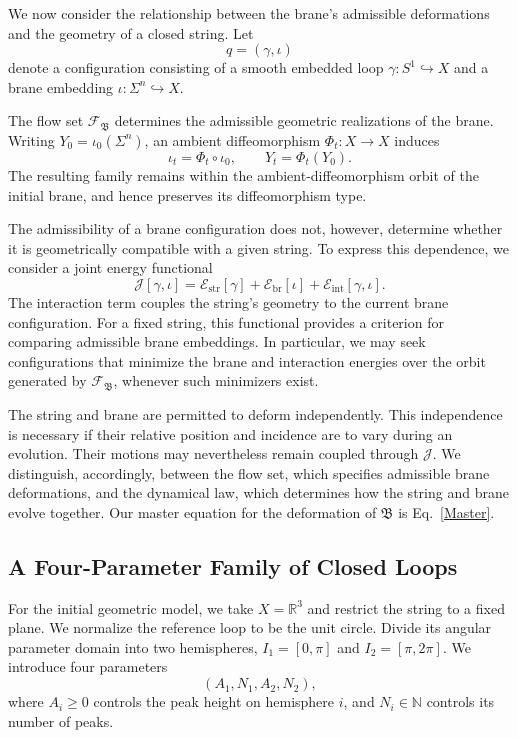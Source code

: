 \documentclass{article}
\numberwithin{tm}{section}
\numberwithin{dn}{section}
\numberwithin{as}{section}
\numberwithin{rk}{section}
\numberwithin{lem}{section}
\numberwithin{ax}{section}
\numberwithin{pp}{section}
\numberwithin{eg}{section}
\numberwithin{war}{section}
\numberwithin{equation}{section}
\numberwithin{prop}{section}
\numberwithin{nt}{section}
\numberwithin{rc}{section}
\begin{document}
We now consider the relationship between the brane's
admissible deformations and the geometry of a closed string.
Let
\[
q=(\gamma,\iota)
\]
denote a configuration consisting of a smooth embedded loop
$\gamma:S^1\hookrightarrow X$ and a brane embedding
$\iota:\Sigma^n\hookrightarrow X$.

The flow set $\mathscr{F}_{\mathfrak{B}}$ determines the
admissible geometric realizations of the brane. Writing
$Y_0=\iota_0(\Sigma^n)$, an ambient diffeomorphism
$\Phi_t:X\to X$ induces
\[
\iota_t=\Phi_t\circ\iota_0,
\qquad
Y_t=\Phi_t(Y_0).
\]
The resulting family remains within the ambient-diffeomorphism
orbit of the initial brane, and hence preserves its
diffeomorphism type.

The admissibility of a brane configuration does not, however,
determine whether it is geometrically compatible with a given
string. To express this dependence, we consider a joint energy
functional
\[
\mathcal{J}[\gamma,\iota]
=
\mathcal{E}_{\mathrm{str}}[\gamma]
+\mathcal{E}_{\mathrm{br}}[\iota]
+\mathcal{E}_{\mathrm{int}}[\gamma,\iota].
\]
The interaction term couples the string's geometry to the
current brane configuration. For a fixed string, this
functional provides a criterion for comparing admissible
brane embeddings. In particular, we may seek configurations
that minimize the brane and interaction energies over the
orbit generated by $\mathscr{F}_{\mathfrak{B}}$, whenever
such minimizers exist.

The string and brane are permitted to deform independently.
This independence is necessary if their relative position
and incidence are to vary during an evolution. Their motions
may nevertheless remain coupled through $\mathcal{J}$.
We distinguish, accordingly, between the flow set, which
specifies admissible brane deformations, and the dynamical
law, which determines how the string and brane evolve
together. Our master equation for the deformation of $\mathfrak{B}$ is Eq.~\eqref{Master}.

\subsection{A Four-Parameter Family of Closed Loops}
\label{subsec:loop-family}

For the initial geometric model, we take $X=\mathbb{R}^3$
and restrict the string to a fixed plane. We normalize the reference loop to be the unit circle.
Divide its angular parameter domain into two hemispheres,
$I_1=[0,\pi]$ and $I_2=[\pi,2\pi]$. We introduce four
parameters
\[
(A_1,N_1,A_2,N_2),
\]
where $A_i\geq 0$ controls the peak height on hemisphere $i$,
and $N_i\in\mathbb{N}$ controls its number of peaks.
\end{document}
